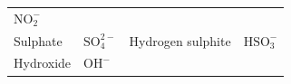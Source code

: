 {\begin{tabular}[t]{|l|l|l|l|}
    
        \begin{math}\mathrm{NO}_{2}^{-}\end{math}%
     \tabularnewline\cline{1-1}\cline{2-2}\cline{3-3}\cline{4-4}
    
    
        Sulphate &
    
    
        \begin{math}\mathrm{SO}_{4}^{2-}\end{math} &
    
    
        Hydrogen sulphite &
    
    
        \begin{math}\mathrm{HSO}_{3}^{-}\end{math}%
     \tabularnewline\cline{1-1}\cline{2-2}\cline{3-3}\cline{4-4}
    
    
        Hydroxide &
    
    
        \begin{math}{\mathrm{OH}}^{-}\end{math} &
    

\end{tabular}}
